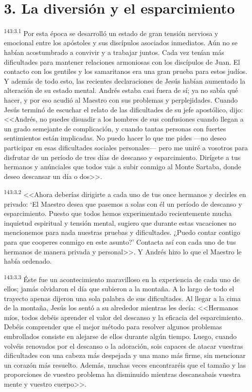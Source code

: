 \section*{3. La diversión y el esparcimiento}
\par 
\textsuperscript{143:3.1} Por esta época se desarrolló un estado de gran tensión nerviosa y emocional entre los apóstoles y sus discípulos asociados inmediatos. Aún no se habían acostumbrado a convivir y a trabajar juntos. Cada vez tenían más dificultades para mantener relaciones armoniosas con los discípulos de Juan. El contacto con los gentiles y los samaritanos era una gran prueba para estos judíos. Y además de todo esto, las recientes declaraciones de Jesús habían aumentado la alteración de su estado mental. Andrés estaba casi fuera de sí; ya no sabía qué hacer, y por eso acudió al Maestro con sus problemas y perplejidades. Cuando Jesús terminó de escuchar el relato de las dificultades de su jefe apostólico, dijo: <<Andrés, no puedes disuadir a los hombres de sus confusiones cuando llegan a un grado semejante de complicación, y cuando tantas personas con fuertes sentimientos están implicadas. No puedo hacer lo que me pides ---no deseo participar en esas dificultades sociales personales--- pero me uniré a vosotros para disfrutar de un período de tres días de descanso y esparcimiento. Dirígete a tus hermanos y anúnciales que todos vais a subir conmigo al Monte Sartaba, donde deseo descansar un día o dos>>.

\par 
\textsuperscript{143:3.2} <<Ahora deberías dirigirte a cada uno de tus once hermanos y decirles en privado: `El Maestro desea que pasemos a solas con él un período de descanso y esparcimiento. Puesto que todos hemos experimentado recientemente mucha inquietud espiritual y tensión mental, sugiero que durante estas vacaciones no mencionemos para nada nuestras pruebas y dificultades. ¿Puedo contar contigo para que cooperes conmigo en este asunto?' Contacta así con cada uno de tus hermanos de manera privada y personal>>. Y Andrés hizo lo que el Maestro le había ordenado.

\par 
\textsuperscript{143:3.3} Éste fue un acontecimiento maravilloso en la experiencia de cada uno de ellos; jamás olvidaron el día que subieron a la montaña. A lo largo de todo el trayecto apenas dijeron una sola palabra de sus dificultades. Al llegar a la cima de la montaña, Jesús los sentó a su alrededor mientras les decía: <<Hermanos míos, todos debéis aprender el valor del descanso y la eficacia del esparcimiento. Debéis comprender que el mejor método para resolver algunos problemas embrollados consiste en alejarse de ellos durante algún tiempo. Luego, cuando volvéis renovados por el descanso o la adoración, sois capaces de atacar vuestras dificultades con una cabeza más despejada y una mano más firme, sin mencionar un corazón más resuelto. Además, muchas veces encontraréis que el tamaño y las proporciones de vuestro problema ha disminuido mientras descansabais vuestra mente y vuestro cuerpo>>.

